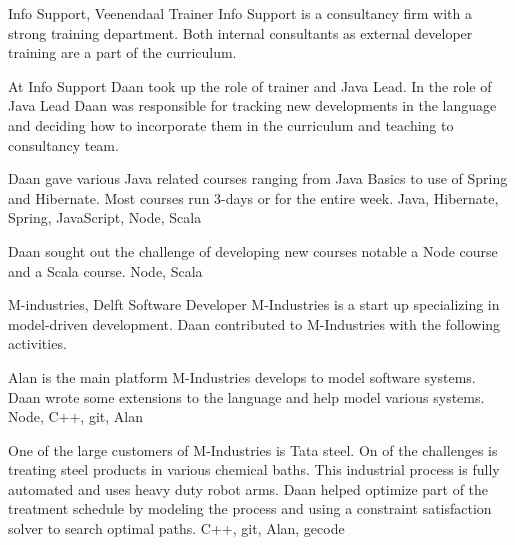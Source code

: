   \begin{workExperience}{Info Support, Veenendaal}%
  {Trainer}{}
  Info Support is a consultancy firm with a strong training department. Both
  internal consultants as external developer training are a part of the curriculum.

  At Info Support Daan took up the role of trainer and Java Lead. In the role of
  Java Lead Daan was responsible for tracking new developments in the language
  and deciding how to incorporate them in the curriculum and teaching to
  consultancy team. 

  Daan gave various Java related courses ranging from Java Basics to use of
  Spring and Hibernate. Most courses run 3-days or for the entire week.
  \technics Java, Hibernate, Spring, JavaScript, Node, Scala

  Daan sought out the challenge of developing new courses notable a Node course
  and a Scala course.
  \technics Node, Scala

  \end{workExperience}

  \begin{workExperience}{M-industries, Delft}%
  {Software Developer}{}
  M-Industries is a start up specializing in model-driven development. Daan
  contributed to M-Industries with the following activities.

  Alan is the main platform M-Industries develops to model software systems.
  Daan wrote some extensions to the language and help model various systems.
  \technics Node, C++, git, Alan

  One of the large customers of M-Industries is Tata steel. On of the challenges
  is treating steel products in various chemical baths. This industrial process
  is fully automated and uses heavy duty robot arms.
  Daan helped optimize part of the treatment schedule by modeling the process
  and using a constraint satisfaction solver to search optimal paths.
  \technics C++, git, Alan, gecode

  
  \end{workExperience}

